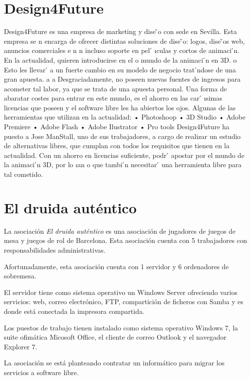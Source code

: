 \documentclass[a4paper]{article}
\begin{document}
\section{Design4Future}
Design4Future es una empresa de marketing y dise ̃o con sede en Sevilla. Esta empresa se
n
encarga de ofrecer distintas soluciones de dise ̃o: logos, dise ̃os web, anuncios comerciales e
n
n
incluso soporte en pel ́
ıculas y cortos de animaci ́n. En la actualidad, quieren introducirse en el
o
mundo de la animaci ́n en 3D.
o
Esto les llevar ́ a un fuerte cambio en su modelo de negocio trat ́ndose de una gran apuesta.
a
a
Desgraciadamente, no poseen nuevas fuentes de ingresos para acometer tal labor, ya que se trata
de una apuesta personal. Una forma de abaratar costes para entrar en este mundo, es el ahorro
en las car ́
ısimas licencias que poseen y el software libre les ha abiertos los ojos. Algunas de las
herramientas que utilizan en la actualidad:
• Photoshoop
• 3D Studio
• Adobe Premiere
• Adobe Flash
• Adobe Ilustrator
• Pro tools
Design4Future ha puesto a Jose ManStall, uno de sus trabajadores, a cargo de realizar un
estudio de alternativas libres, que cumplan con todos los requisitos que tienen en la actualidad.
Con un ahorro en licencias suficiente, podr ́ apostar por el mundo de la animaci ́n 3D, por lo
ıan
o
que tambi ́n necesitar ́ una herramienta libre para tal cometido.



  \section{El druida auténtico}
  La asociación \textit{El druida auténtico} es una asociación de jugadores de juegos de mesa y juegos de rol de Barcelona.
  Esta asociación cuenta con 5 trabajadores con responsabilidades administrativas.
  
  Afortunadamente, esta asociación cuenta con 1 servidor y 6 ordenadores de sobremesa.
  
  El servidor tiene como sistema operativo un Windows Server ofreciendo varios servicios: web, correo electrónico, FTP,
  compartición de ficheros con Samba y es donde está conectada la impresora compartida.
  
  Los puestos de trabajo tienen instalado como sistema operativo Windows 7, la suite ofimática Micosoft Office, el cliente
  de correo Outlook y el navegador Explorer 7.
  
  La asociación se está planteando contratar un informático para migrar los servicios a software libre.
  
\end{document}
